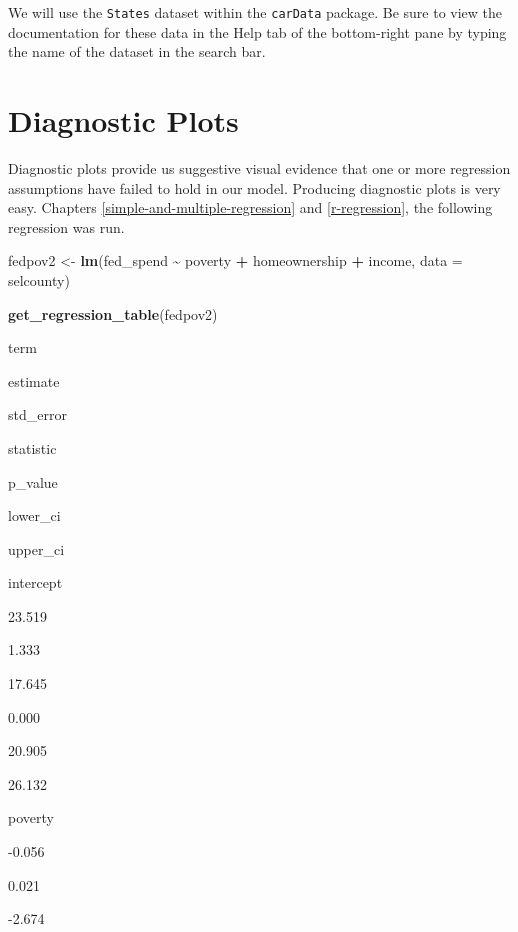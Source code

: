 \documentclass[
]{book}
\makeatletter
\newenvironment{Shaded}{\begin{snugshade}}{\end{snugshade}}
\newcommand{\AttributeTok}[1]{\textcolor[rgb]{0.27,0.27,0.27}{#1}}
\newcommand{\FunctionTok}[1]{\textcolor[rgb]{0.27,0.27,0.27}{\textbf{#1}}}
\newcommand{\NormalTok}[1]{#1}
\newcommand{\OtherTok}[1]{\textcolor[rgb]{0.37,0.37,0.37}{#1}}
\newcommand{\SpecialCharTok}[1]{\textcolor[rgb]{0.43,0.43,0.43}{\textbf{#1}}}
\newenvironment{kframe}{%
\medskip{}
\setlength{\fboxsep}{.8em}
 \def\at@end@of@kframe{}%
 \ifinner\ifhmode%
  \def\at@end@of@kframe{\end{minipage}}%
  \begin{minipage}{\columnwidth}%
 \fi\fi%
 \def\FrameCommand##1{\hskip\@totalleftmargin \hskip-\fboxsep
 \colorbox{shadecolor}{##1}\hskip-\fboxsep
     \hskip-\linewidth \hskip-\@totalleftmargin \hskip\columnwidth}%
 \MakeFramed {\advance\hsize-\width
   \@totalleftmargin\z@ \linewidth\hsize
   \@setminipage}}%
 {\par\unskip\endMakeFramed%
 \at@end@of@kframe}
\renewenvironment{Shaded}{\begin{kframe}}{\end{kframe}}
\makeatother
\begin{document}
We will use the \texttt{States} dataset within the \texttt{carData} package. Be sure to view the documentation for these data in the Help tab of the bottom-right pane by typing the name of the dataset in the search bar.

\hypertarget{diagnostic-plots}{%
\section{Diagnostic Plots}\label{diagnostic-plots}}

Diagnostic plots provide us suggestive visual evidence that one or more regression assumptions have failed to hold in our model. Producing diagnostic plots is very easy. Chapters \ref{simple-and-multiple-regression} and \ref{r-regression}, the following regression was run.

\begin{Shaded}
\begin{Highlighting}[]
\NormalTok{fedpov2 }\OtherTok{\textless{}{-}} \FunctionTok{lm}\NormalTok{(fed\_spend }\SpecialCharTok{\textasciitilde{}}\NormalTok{ poverty }\SpecialCharTok{+}\NormalTok{ homeownership }\SpecialCharTok{+}\NormalTok{ income, }\AttributeTok{data =}\NormalTok{ selcounty)}
\end{Highlighting}
\end{Shaded}

\begin{Shaded}
\begin{Highlighting}[]
\FunctionTok{get\_regression\_table}\NormalTok{(fedpov2)}
\end{Highlighting}
\end{Shaded}

term

estimate

std\_error

statistic

p\_value

lower\_ci

upper\_ci

intercept

23.519

1.333

17.645

0.000

20.905

26.132

poverty

-0.056

0.021

-2.674
\end{document}

